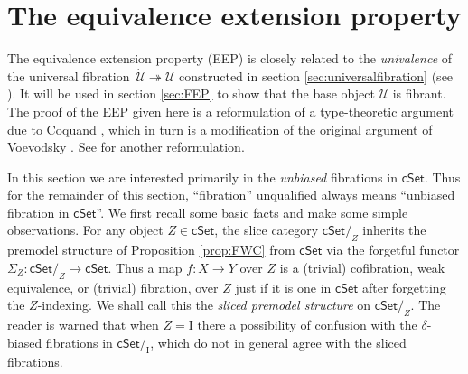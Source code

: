 \documentclass[12pt]{article}
\newcommand{\cSet}{\ensuremath{\mathsf{cSet}}}
\newcommand{\fib}{\ensuremath{\twoheadrightarrow}}
\renewcommand{\to}{\ensuremath{\rightarrow}}
\newcommand{\I}{\ensuremath{\mathrm{I}}}
\newcommand{\U}{\ensuremath{\mathcal{U}}}
\newcommand{\UU}{\ensuremath{\,\dot{\mathcal{U}}}}
\theoremstyle{remark}
\theoremstyle{definition}
\begin{document}
\section{The equivalence extension property}\label{sec:EEP}

The equivalence extension property (EEP) is closely related to the \emph{univalence} of the universal fibration $\UU\fib\U$ constructed in section \ref{sec:universalfibration} (see \cite{Shu2015}).  It will be used in section \ref{sec:FEP} to show that the base object $\U$ is fibrant.  The proof of the EEP given here is a reformulation of a type-theoretic argument due to Coquand \cite{CCHM}, which in turn is a modification of the original argument of Voevodsky \cite{KLV}.  See \cite{sattler} for another reformulation.  

In this section we are interested primarily in the \emph{unbiased} fibrations in $\cSet$. 
Thus for the remainder of this section, ``fibration'' unqualified always means ``unbiased fibration in $\cSet$''.  
We first recall some basic facts and make some simple observations. 
For any object $Z \in\cSet$, the slice category $\cSet/_Z$ inherits the premodel structure of Proposition \ref{prop:FWC} from $\cSet$ via the forgetful functor $\Sigma_Z : \cSet/_Z \to \cSet$.  Thus a map $f : X \to Y$ over $Z$ is a (trivial) cofibration, weak equivalence, or (trivial) fibration, over $Z$ just if it is one in $\cSet$ after forgetting the $Z$-indexing. We shall call this the \emph{sliced premodel structure} on $\cSet/_Z$.  The reader is warned that when $Z = \I$ there a possibility of confusion with the $\delta$-biased fibrations in $\cSet/_\I$, which do not in general agree with the sliced fibrations.  
\end{document}
